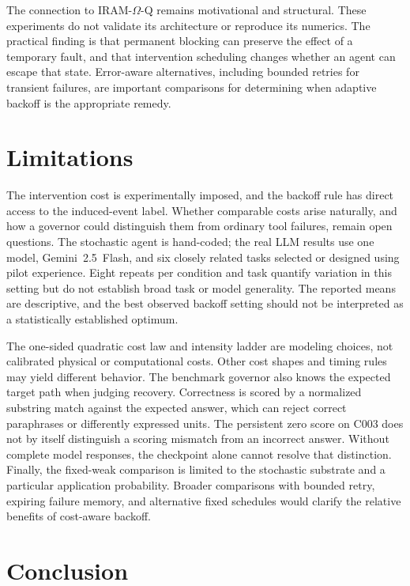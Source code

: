\documentclass[11pt]{article}
\begin{document}
The connection to IRAM-$\Omega$-Q remains motivational and structural. These
experiments do not validate its architecture or reproduce its numerics. The
practical finding is that permanent blocking can preserve the effect of a
temporary fault, and that intervention scheduling changes whether an agent can
escape that state. Error-aware alternatives, including bounded retries for
transient failures, are important comparisons for determining when adaptive
backoff is the appropriate remedy.

\section{Limitations}

The intervention cost is experimentally imposed, and the backoff rule has
direct access to the induced-event label. Whether comparable costs arise
naturally, and how a governor could distinguish them from ordinary tool
failures, remain open questions. The stochastic agent is hand-coded; the real
LLM results use one model, Gemini~2.5~Flash, and six closely related tasks
selected or designed using pilot experience. Eight repeats per condition and
task quantify variation in this setting but do not establish broad task or
model generality. The reported means are descriptive, and the best observed
backoff setting should not be interpreted as a statistically established
optimum.

The one-sided quadratic cost law and intensity ladder are modeling choices,
not calibrated physical or computational costs. Other cost shapes and timing
rules may yield different behavior. The benchmark governor also knows the
expected target path when judging recovery. Correctness is scored by a
normalized substring match against the expected answer, which can reject
correct paraphrases or differently expressed units. The persistent zero score
on C003 does not by itself distinguish a scoring mismatch from an incorrect
answer. Without complete model responses, the checkpoint alone cannot resolve
that distinction. Finally, the
fixed-weak comparison is limited to the stochastic substrate and a particular
application probability. Broader comparisons with bounded retry, expiring
failure memory, and alternative fixed schedules would clarify the relative
benefits of cost-aware backoff.

\section{Conclusion}
\end{document}
